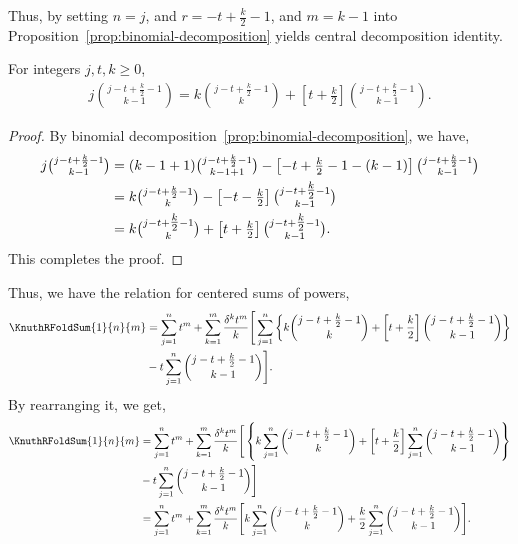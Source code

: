Thus, by setting $n=j$, and $r=-t+\frac{k}{2} -1$, and $m=k-1$
into Proposition~\eqref{prop:binomial-decomposition}
yields central decomposition identity.
\begin{corollary}
  \label{cor:central-binomial-decomposition}
  For integers $j,t,k \geq 0$,
  \begin{align*}
    j \binom{j-t+\frac{k}{2} -1}{k-1}
    = k \binom{j-t+\frac{k}{2}-1}{k}
    + \left [t+\frac{k}{2} \right ]
    \binom{j-t+\frac{k}{2}-1}{k-1}.
  \end{align*}
  \begin{proof}
    By binomial decomposition~\eqref{prop:binomial-decomposition}, we have,
    \begin{align*}
      j \tbinom{j-t+\frac{k}{2} -1}{k-1}
      &=
      (k-1+1) \tbinom{j-t+\frac{k}{2} -1}{k-1+1}
      - \left [-t+\tfrac{k}{2} -1-(k-1)\right ]
      \tbinom{j-t+\frac{k}{2} -1}{k-1} \\
      &= k \tbinom{j-t+\frac{k}{2}-1}{k}
      - \left [-t-\tfrac{k}{2} \right ]
      \tbinom{j-t+\tfrac{k}{2}-1}{k-1} \\
      &= k \tbinom{j-t+\tfrac{k}{2}-1}{k}
      + \left [t+\tfrac{k}{2} \right ]
      \tbinom{j-t+\tfrac{k}{2}-1}{k-1}.
    \end{align*}
    This completes the proof.
  \end{proof}
\end{corollary}
Thus, we have the relation for centered sums of powers,
\begin{align*}
  \KnuthRFoldSum{1}{n}{m}
  &= \sum_{j=1}^{n} t^m + \sum_{k=1}^{m} \frac{\delta^{k} t^m}{k}
  \Bigg [
    \sum_{j=1}^{n} \left \{ k \binom{j-t+\frac{k}{2}-1}{k}
      + \left [t+\frac{k}{2} \right ]
    \binom{j-t+\frac{k}{2}-1}{k-1} \right \} \\
    &- t \sum_{j=1}^{n} \binom{j-t+\frac{k}{2}-1}{k-1}
  \Bigg ].
\end{align*}
By rearranging it, we get,
\begin{align*}
  \KnuthRFoldSum{1}{n}{m}
  &= \sum_{j=1}^{n} t^m + \sum_{k=1}^{m} \frac{\delta^{k} t^m}{k}
  \Bigg [
    \left \{ k \sum_{j=1}^{n} \binom{j-t+\frac{k}{2}-1}{k}
      + \left [t+\frac{k}{2} \right ]
    \sum_{j=1}^n \binom{j-t+\frac{k}{2}-1}{k-1} \right \} \\
    &- t \sum_{j=1}^{n} \binom{j-t+\frac{k}{2}-1}{k-1}
  \Bigg ] \\
  &= \sum_{j=1}^{n} t^m + \sum_{k=1}^{m} \frac{\delta^{k} t^m}{k}
  \Bigg [
    k \sum_{j=1}^{n} \binom{j-t+\frac{k}{2}-1}{k}
    + \frac{k}{2}
    \sum_{j=1}^n \binom{j-t+\frac{k}{2}-1}{k-1}
  \Bigg ].
\end{align*}
